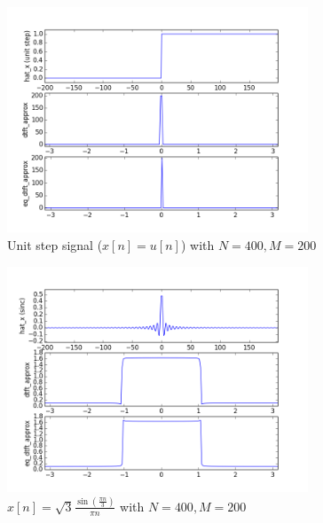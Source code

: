 \begin{figure}[htbp]
	\centering
	\includegraphics[width=0.8\textwidth]{images/p6-4-2-200}
	\caption{Unit step signal ($x[n]=u[n]$) with $N=400, M=200$}
	\label{fig:p6-4-2-200}
\end{figure}

\begin{figure}[htbp]
	\centering
	\includegraphics[width=0.8\textwidth]{images/p6-5-2-200}
	\caption{$x[n] = \sqrt{3}\frac{\sin(\frac{\pi n}{3})}{\pi n}$ with $N=400, M=200$}
	\label{fig:p6-5-2-200}
\end{figure}